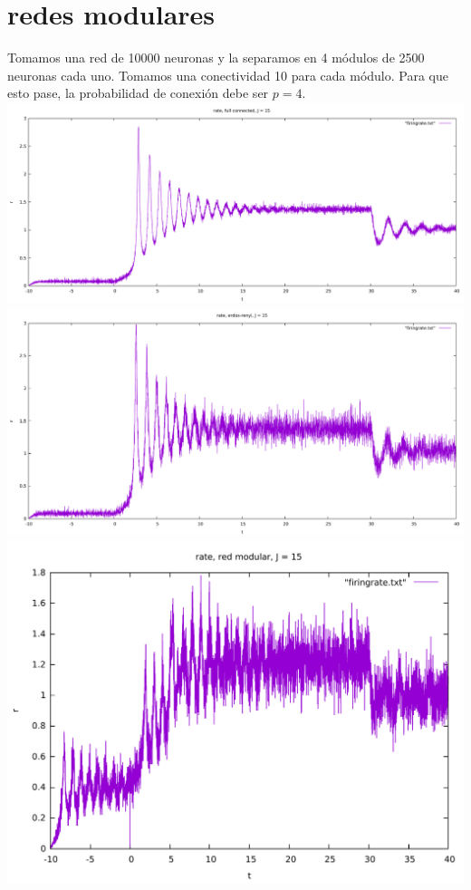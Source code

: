 \documentclass[a4paper]{article}
\begin{document}
\section{redes modulares}
Tomamos una red de 10000 neuronas y la separamos en 4 módulos de 2500 neuronas cada uno. Tomamos una conectividad 10 para cada módulo. Para que esto pase, la probabilidad de conexión debe ser  $p=4$.\\
\includegraphics[scale=0.2]{fullconnected_rate_J15.pdf}\\
\includegraphics[scale=0.2]{erdos_rate_J15.pdf}\\
\includegraphics[scale=0.4]{modular_rate_J15.pdf}\\
\end{document}
